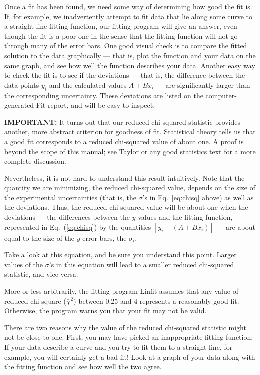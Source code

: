 Once a fit has been found, we need some way of determining
how good the fit is.  If, for example, we inadvertently attempt
to fit data that lie along some curve to a straight line
fitting function, our fitting program will give an answer, even though
the fit is a poor one in the sense that the fitting function
will not go through many of the error bars.
One good visual check is to compare the fitted
solution to the data graphically --- that is, plot the function and
your data on the same graph, and see how well the function
describes your data.  Another easy way to check the fit is to see
if the deviations --- that is, the difference between the data
points $y_{i}$ and the calculated values $A + Bx_{i}$ --- are significantly
larger than the corresponding uncertainty.  These deviations are listed on the 
computer-generated Fit report,
and will be easy to inspect.

{\bf IMPORTANT:}  It turns out that our reduced chi-squared statistic
provides another, more abstract criterion for goodness of fit.
Statistical theory tells us that a good fit corresponds to a reduced
chi-squared value of about one.  A proof is beyond the scope of
this manual; see Taylor or any good statistics text for a more
complete discussion.

Nevertheless, it is not hard to understand this result intuitively.
 Note that the quantity we are minimizing, the reduced
chi-squared value, depends on the size of the experimental
uncertainties (that is, the $\sigma$'s in Eq.~\ref{eq:chisq} above)
as well as the
deviations.   Thus, the reduced chi-squared value will be about one
when the deviations --- the differences between the $y$ values
and the fitting function, represented in Eq.~(\ref{eq:chisq}) by the
quantities $ \left[y_{i} -  (A + Bx_{i})\right] $ --- are about
equal to the size of the $y$ error bars, the $\sigma_i$.

Take a look at this equation, and be sure you understand
this point.  Larger values of the $\sigma$'s in this equation will
lead to a smaller reduced chi-squared statistic, and vice versa.

More or less arbitrarily, the fitting
program Linfit assumes that any value of reduced chi-square
($\bar{\chi}^2$) between 0.25 and 4 represents a
reasonably good fit.  Otherwise, the program warns you that your fit
may not be valid.

There are two reasons why the value of the reduced
chi-squared statistic might not be close to one.  First, you may have
picked an inappropriate fitting function: If your data describe a
curve and you try to fit them to a straight line, for example, you
will certainly get a bad fit!  Look at a graph of your data along with
the fitting function and see how well the two agree.

